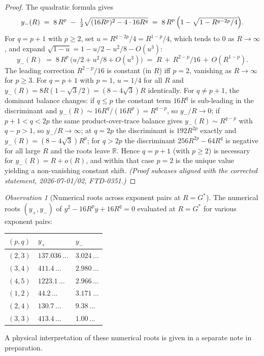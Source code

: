 \documentclass[11pt]{article}
\theoremstyle{definition}
\theoremstyle{remark}
\newtheorem*{observation}{Observation}
\newcommand{\Gs}{G^{*}}
\newcommand{\R}{\mathbb{R}}
\begin{document}
\begin{proof}
The quadratic formula gives
\[
y_-(R) \;=\; 8\,R^p \;-\; \tfrac{1}{2}\sqrt{(16 R^p)^2 - 4\cdot 16 R^q}
       \;=\; 8\,R^p\,\Bigl(1 - \sqrt{1 - R^{q - 2p}/4}\Bigr).
\]
For $q = p+1$ with $p \geq 2$, set $u = R^{q-2p}/4 = R^{1-p}/4$, which
tends to $0$ as $R \to \infty$, and expand
$\sqrt{1-u} = 1 - u/2 - u^2/8 - O(u^3)$:
\[
y_-(R) \;=\; 8\,R^p\,\bigl(u/2 + u^2/8 + O(u^3)\bigr)
       \;=\; R \,+\, R^{2-p}/16 \,+\, O(R^{1-p}).
\]
The leading correction $R^{2-p}/16$ is constant (in $R$) iff $p = 2$,
vanishing as $R \to \infty$ for $p \geq 3$. For $q = p+1$ with $p = 1$,
$u = 1/4$ for all $R$ and $y_-(R) = 8R(1 - \sqrt{3}/2) = (8 - 4\sqrt3)R$
identically. For $q \neq p+1$, the dominant balance changes: if
$q \leq p$ the constant term $16 R^q$ is sub-leading in the discriminant
and $y_-(R) \sim 16R^{q}/(16R^{p}) = R^{q-p}$, so $y_-/R \to 0$; if
$p+1 < q < 2p$ the same product-over-trace balance gives
$y_-(R) \sim R^{q-p}$ with $q - p > 1$, so $y_-/R \to \infty$; at
$q = 2p$ the discriminant is $192R^{2p}$ exactly and
$y_-(R) = (8 - 4\sqrt3)R^{p}$; for $q > 2p$ the discriminant
$256R^{2p} - 64R^{q}$ is negative for all large $R$ and the roots leave
$\R$. Hence $q = p+1$ (with $p \geq 2$) is necessary for
$y_-(R) = R + o(R)$, and within that case $p = 2$ is the unique value
yielding a non-vanishing constant shift. \emph{(Proof subcases aligned
with the corrected statement, 2026-07-01/02, FTD-0351.)}
\end{proof}

\begin{observation}[Numerical roots across exponent pairs at $R = \Gs$]\label{obs:23-joint-match}
The numerical roots $(y_+, y_-)$ of $y^{2} - 16 R^{p} y + 16 R^{q} = 0$
evaluated at $R = \Gs$ for various exponent pairs:
\begin{center}
\begin{tabular}{lll}
\toprule
$(p, q)$ & $y_+$ & $y_-$ \\
\midrule
$(2, 3)$ & $137.036\,\ldots$ & $3.024\,\ldots$ \\
$(3, 4)$ & $411.4\,\ldots$   & $2.980\,\ldots$ \\
$(4, 5)$ & $1223.1\,\ldots$  & $2.966\,\ldots$ \\
$(1, 2)$ & $44.2\,\ldots$    & $3.171\,\ldots$ \\
$(2, 4)$ & $130.7\,\ldots$   & $9.38\,\ldots$ \\
$(3, 3)$ & $413.4\,\ldots$   & $1.00\,\ldots$ \\
\bottomrule
\end{tabular}
\end{center}
A physical interpretation of these numerical roots is given in a
separate note in preparation.
\end{observation}
\end{document}
